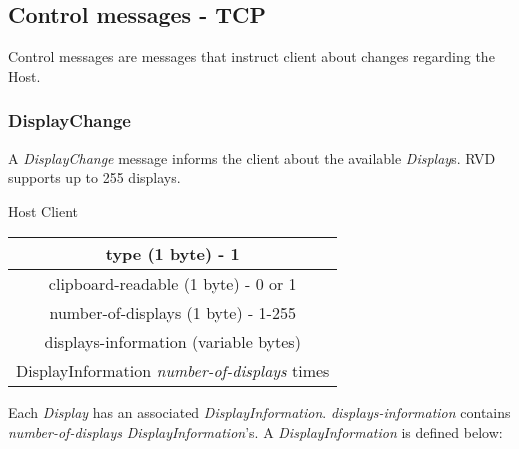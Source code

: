 \documentclass{article}
\begin{document}
    \subsection{Control messages - TCP}
    Control messages are messages that instruct client about changes regarding the Host.

    \subsubsection{DisplayChange}
    A \emph{DisplayChange} message informs the client about the available \emph{Display}s. RVD supports up to 255 displays.

    \begin{center}
        Host \textrightarrow Client\\
        \begin{tabular}{|c|}
            \hline
            type (1 byte) - 1                                  \\
            \hline
            clipboard-readable (1 byte) - 0 or 1               \\
            \hline
            number-of-displays (1 byte) - 1-255                \\
            \hline
            displays-information (variable bytes)              \\
            \hline
            DisplayInformation \emph{number-of-displays} times \\
            \hline
        \end{tabular}
    \end{center}

    Each \emph{Display} has an associated \emph{DisplayInformation}. \emph{displays-information} contains \emph{number-of-displays} \emph{DisplayInformation}'s. A \emph{DisplayInformation} is defined below:
\end{document}
